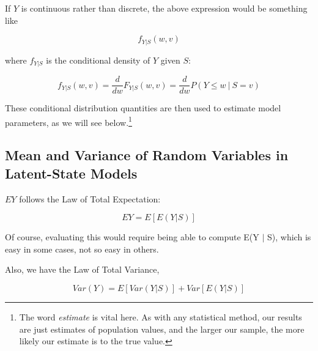 \documentclass[11pt]{article}
\begin{document}
If $Y$ is continuous rather than discrete, the above expression would be
something like

\begin{equation}
f_{Y|S} (w,v) 
\end{equation}

where $f_{Y|S}$ is the conditional density of $Y$ given $S$:

\begin{equation}
f_{Y|S}(w,v) 
= \frac{d}{dw} F_{Y|S}(w,v) 
= \frac{d}{dw} P(Y \leq w ~|~ S = v)
\end{equation}

These conditional distribution quantities are then used to estimate
model parameters, as we will see below.\footnote{The word
\textit{estimate} is vital here.  As with any statistical method, our
results are just estimates of population values, and the larger our
sample, the more likely our estimate is to the true value.}

\subsection{Mean and Variance of Random Variables in Latent-State Models}
\label{mixmeanvar}

$EY$ follows the Law of Total Expectation:

\begin{equation}
\label{mixmean}
EY = E[E(Y | S)]
\end{equation}

Of course, evaluating this would require being able to compute E(Y $|$
S), which is easy in some cases, not so easy in others.

Also, we have the Law of Total Variance, 

\begin{equation}
\label{mixvar}
Var(Y) = E[Var(Y|S)] + Var[E(Y|S)]
\end{equation}

% 
% 
% 
\end{document}
